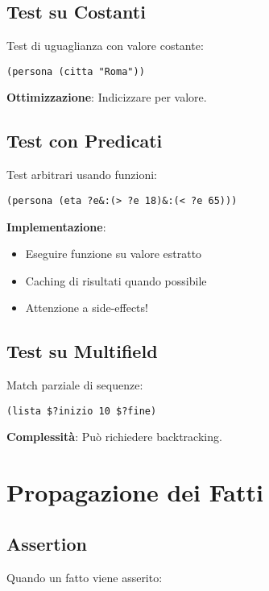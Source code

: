 \subsection{Test su Costanti}

Test di uguaglianza con valore costante:

\begin{lstlisting}[language=CLIPS]
(persona (citta "Roma"))
\end{lstlisting}

\textbf{Ottimizzazione}: Indicizzare per valore.

\subsection{Test con Predicati}

Test arbitrari usando funzioni:

\begin{lstlisting}[language=CLIPS]
(persona (eta ?e&:(> ?e 18)&:(< ?e 65)))
\end{lstlisting}

\textbf{Implementazione}:
\begin{itemize}
\item Eseguire funzione su valore estratto
\item Caching di risultati quando possibile
\item Attenzione a side-effects!
\end{itemize}

\subsection{Test su Multifield}

Match parziale di sequenze:

\begin{lstlisting}[language=CLIPS]
(lista $?inizio 10 $?fine)
\end{lstlisting}

\textbf{Complessità}: Può richiedere backtracking.

\section{Propagazione dei Fatti}

\subsection{Assertion}

Quando un fatto viene asserito:

